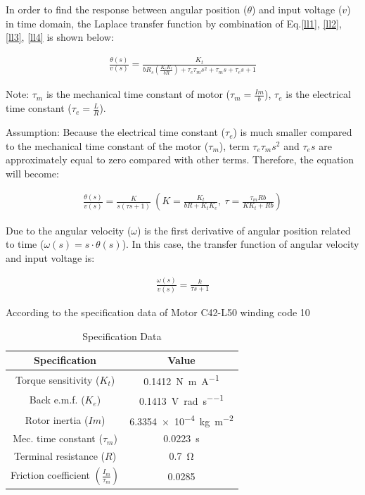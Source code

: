 \documentclass[conference]{IEEEtran}
\begin{document}
In order to find the response between angular position ($\theta$) and input voltage ($v$) in time domain, the Laplace transfer function by combination of Eq.\ref{ll1}, \ref{ll2}, \ref{ll3}, \ref{ll4} is shown below:

\begin{align}
    \frac{\theta (s)}{v(s)} = \frac{K_t}{bR_s (\frac{K_e K_t}{bR}) + \tau_e \tau_m s^2 + \tau_m s + \tau_e s +1}
\end{align}

Note: $\tau_m$ is the mechanical time constant of motor ($\tau_m=\frac{Im}{b}$), $\tau_e$ is the electrical time constant ($\tau_e=\frac{L}{R}$).

Assumption: Because the electrical time constant ($\tau_e$) is much smaller compared to the mechanical time constant of the motor ($\tau_m$), term $\tau_e\tau_ms^2$ and $\tau_es$ are approximately equal to zero compared with other terms. Therefore, the equation will become:

\begin{align}
    \frac{\theta (s)}{v(s)} = \frac{K}{s(\tau s + 1)} \ \left( K = \frac{K_t}{bR + K_t K_e}, \ \tau = \frac{\tau_m Rb}{K K_t + Rb} \right)
\end{align}

Due to the angular velocity ($\omega$) is the first derivative of angular position related to time ($\omega\left(s\right)=s\cdot\theta\left(s\right)$). In this case, the transfer function of angular velocity and input voltage is:

\begin{align}
    \frac{\omega(s)}{v(s)} = \frac{k}{\tau s + 1}
\end{align}

According to the specification data of Motor C42-L50 winding code 10 

\begin{table}[htbp]
    \caption{Specification Data}
    \begin{center}
    \begin{tabular}{|c|c|}
    \hline
    \textbf{Specification} & \textbf{Value}\\
    \hline
    \hline
    Torque sensitivity ($K_t$) & \SI{0.1412}{\newton\metre\per\ampere}\\
    \hline
    Back e.m.f. ($K_e$) & \SI{0.1413}{\volt\per\radian\per\second}\\
    \hline
    Rotor inertia ($Im$) & \SI{6.3354e-4}{\kg\per\meter\squared}\\
    \hline
    Mec. time constant ($\tau_m$) & \SI{0.0223}{\second}\\
    \hline
    Terminal resistance ($R$) & \SI{0.7}{\ohm}\\
    \hline
    Friction coefficient $\left(\frac{I_m}{\tau_m}\right)$ & \SI{0.0285}{}\\
    \hline
    \end{tabular}
    \label{sdtable}
    \end{center}
\end{table}
\end{document}
